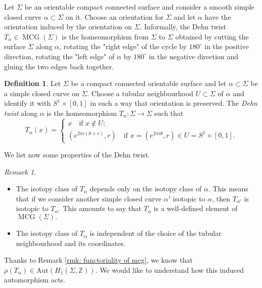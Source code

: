 \documentclass[a4paper,12 pt,titlepage,twoside]{book}
\newcommand{\numberset}{\mathbb}
\newcommand{\Z}{\numberset{Z}}
\DeclareMathOperator{\mcg}{MCG}
\theoremstyle{plain}
\theoremstyle{theorem}
\theoremstyle{definition}
\newtheorem{defn}[thm]{Definition}
\theoremstyle{remark}
\newtheorem{oss}[thm]{Remark}
\begin{document}
	Let $\Sigma$ be an orientable compact connected surface and consider a smooth simple closed curve $\alpha \subset \Sigma$ on it. Choose an orientation for $\Sigma$ and let $\alpha$ have the orientation induced by the orientation on $\Sigma$. Informally, the Dehn twist $T_\alpha \in \mcg(\Sigma)$ is the homeomorphism from $\Sigma$ to $\Sigma$ obtained by cutting the surface $\Sigma$ along $\alpha$, rotating the "right edge" of the cycle by $180^\circ$ in the positive direction, rotating the "left edge" of $\alpha$ by $180^\circ$ in the negative direction and gluing the two edges back together.
	\begin{defn}\label{def: dehn twist}
		Let $\Sigma$ be a compact connected orientable surface and let $\alpha \subset \Sigma$ be a simple closed curve on $\Sigma$. Choose a tubular neighbourhood $U \subset \Sigma$ of $\alpha$ and identify it with $S^1 \times [0,1]$ in such a way that orientation is preserved. The \emph{Dehn twist} along $\alpha$ is the homeomorphism $T_\alpha \colon \Sigma \rightarrow \Sigma$ such that $$T_\alpha(x) = \begin{cases}
		x \quad \text{if } x \notin U; \\ (e^{2\pi i(\theta + r)},r) \quad \text{if } x=(e^{2 \pi i \theta}, r) \in U = S^1 \times [0,1].
		\end{cases}$$
	\end{defn}
	We list now some properties of the Dehn twist.
	\begin{oss}
		\begin{itemize}
			\item The isotopy class of $T_\alpha$ depends only on the isotopy class of $\alpha$. This means that if we consider another simple closed curve $\alpha'$ isotopic to $\alpha$, then $T_{\alpha'}$ is isotopic to $T_\alpha$. This amounts to say that $T_\alpha$ is a well-defined element of $\mcg(\Sigma).$
			\item The isotopy class of $T_\alpha$ is independent of the choice of the tubular neighbourhood and its coordinates.
		\end{itemize}
	\end{oss}
	Thanks to Remark \ref{rmk: functoriality of mcg}, we know that $\rho(T_\alpha) \in \text{Aut}(H_1(\Sigma, \Z)).$ We would like to understand how this induced automorphism acts. 
	
\end{document}
